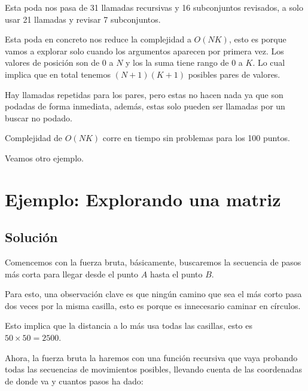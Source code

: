 Esta poda nos pasa de 31 llamadas recursivas y 16 subconjuntos revisados, a solo usar 21 llamadas y revisar 7 subconjuntos.

Esta poda en concreto nos reduce la complejidad a \(O(NK)\), esto es porque vamos a explorar solo cuando los argumentos aparecen por primera vez. Los valores de posición son de \(0\) a \(N\) y los la suma tiene rango de \(0\) a \(K\). Lo cual implica que en total tenemos \((N+1)(K+1)\) posibles pares de valores. 

Hay llamadas repetidas para los pares, pero estas no hacen nada ya que son podadas de forma inmediata, además, estas solo pueden ser llamadas por un buscar no podado.

Complejidad de \(O(NK)\) corre en tiempo sin problemas para los 100 puntos.

Veamos otro ejemplo.

\section{Ejemplo: Explorando una matriz}



\subsection*{Solución}
Comencemos con la fuerza bruta, básicamente, buscaremos la secuencia de pasos más corta para llegar desde el punto \(A\) hasta el punto \(B\).

Para esto, una observación clave es que ningún camino que sea el más corto pasa dos veces por la misma casilla, esto es porque es innecesario caminar en círculos.

Esto implica que la distancia a lo más usa todas las casillas, esto es \(50\times50=2500\).

Ahora, la fuerza bruta la haremos con una función recursiva que vaya probando todas las secuencias de movimientos posibles, llevando cuenta de las coordenadas de donde va y cuantos pasos ha dado:

